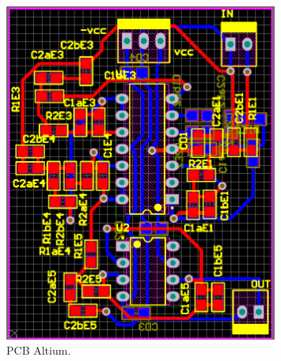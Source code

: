  \begin{figure}[H]
	\centering
	\includegraphics[width=0.8\textwidth]{ImagenesEjercicio2/altiumpcb.PNG}
\caption{PCB Altium.}
	\label{fig:altiumpcb}
\end{figure}
